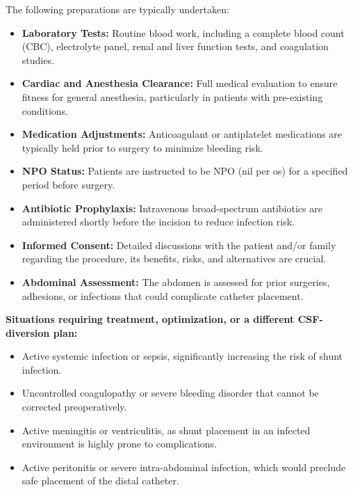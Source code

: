 The following preparations are typically undertaken:

\begin{itemize}
  \item \textbf{Laboratory Tests:} Routine blood work, including a complete blood count (CBC), electrolyte panel, renal and liver function tests, and coagulation studies.
  
  \item \textbf{Cardiac and Anesthesia Clearance:} Full medical evaluation to ensure fitness for general anesthesia, particularly in patients with pre-existing conditions.
  
  \item \textbf{Medication Adjustments:} Anticoagulant or antiplatelet medications are typically held prior to surgery to minimize bleeding risk.
  
  \item \textbf{NPO Status:} Patients are instructed to be NPO (nil per os) for a specified period before surgery.
  
  \item \textbf{Antibiotic Prophylaxis:} Intravenous broad-spectrum antibiotics are administered shortly before the incision to reduce infection risk.
  
  \item \textbf{Informed Consent:} Detailed discussions with the patient and/or family regarding the procedure, its benefits, risks, and alternatives are crucial.
  
  \item \textbf{Abdominal Assessment:} The abdomen is assessed for prior surgeries, adhesions, or infections that could complicate catheter placement.
\end{itemize}

\textbf{Situations requiring treatment, optimization, or a different CSF-diversion plan:}

\begin{itemize}
  \item Active systemic infection or sepsis, significantly increasing the risk of shunt infection.
  \item Uncontrolled coagulopathy or severe bleeding disorder that cannot be corrected preoperatively.
  \item Active meningitis or ventriculitis, as shunt placement in an infected environment is highly prone to complications.
  \item Active peritonitis or severe intra-abdominal infection, which would preclude safe placement of the distal catheter.
\end{itemize}

